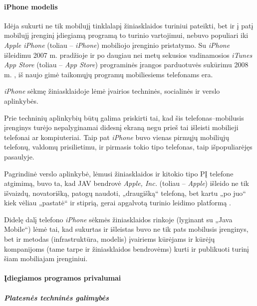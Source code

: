 \documentclass[kursinis-darbas]{vukf}
\begin{document}
\paragraph{iPhone modelis}

Idėja sukurti ne tik mobilujį tinklalapį žiniasklaidos turiniui pateikti, bet ir į patį mobilujį įrenginį įdiegiamą programą to turinio vartojimui, nebuvo populiari iki \emph{Apple iPhone} (toliau – \emph{iPhone}) mobiliojo įrenginio pristatymo. Su \emph{iPhone} išleidimu 2007 m. pradžioje \cite{apple_com_reinvents_the_phone_with_iphone} ir po daugiau nei metų sekusios vadinamosios \emph{iTunes App Store} (toliau – \emph{App Store}) programinės įrangos parduotuvės sukūrimu 2008 m. \cite{apple_com_introduces_the_new_iphone_3g}, iš naujo gimė taikomųjų programų mobiliesiems telefonams era.

\emph{iPhone} sėkmę žiniasklaidoje lėmė įvairios techninės, socialinės \cite{theregister_why_the_iphone_is_success_not_for_the_reasons_you_think} ir verslo aplinkybės.

Prie techninių aplinkybių būtų galima priskirti tai, kad šis telefonas–mobilusis įrenginys turėjo nepalyginamai didesnį ekraną negu prieš tai išleisti mobilieji telefonai ar kompiuteriai. Taip pat \emph{iPhone} buvo vienas pirmųjų mobiliųjų telefonų, valdomų prisilietimu, ir pirmasis tokio tipo telefonas, taip išpopuliarėjęs pasaulyje.

Pagrindinė verslo aplinkybė, lėmusi žiniasklaidos ir kitokio tipo PĮ telefone atgimimą, buvo ta, kad JAV bendrovė \emph{Apple, Inc.} (toliau – \emph{Apple}) išleido ne tik išvaizdų, novatorišką, patogų naudoti, „draugišką“ telefoną, bet kartu „po juo“ kiek vėliau „pastatė“ ir stiprią, gerai apgalvotą turinio leidimo platformą \cite{oreilly_iphones_app_stores_and_ecosystems}.

Didelę dalį telefono \emph{iPhone} sėkmės žiniasklaidos rinkoje (lyginant su „Java Mobile“) lėmė tai, kad sukurtas ir išleistas buvo ne tik pats mobilusis įrenginys, bet ir metodas (infrastruktūra, modelis) įvairiems kūrėjams ir kūrėjų kompanijoms (tame tarpe ir žiniasklaidos bendrovėms) kurti ir publikuoti turinį šiam mobiliajam įrenginiui.

\paragraph{Įdiegiamos programos privalumai}

\subparagraph{Platesnės techninės galimybės}
\end{document}

